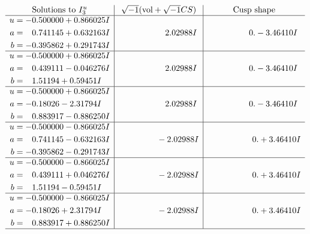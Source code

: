 \documentclass[1p]{elsarticle_modified}
\theoremstyle{definition}
\newcommand{\I}{\sqrt{-1}}
\begin{document}
$$\begin{array}{c|c|c}  
\text{Solutions to }I^u_{3}& \I (\text{vol} + \sqrt{-1}CS) & \text{Cusp shape}\\
 \hline 
\begin{aligned}
u &= -0.500000 + 0.866025 I \\
a &= \phantom{-}0.741145 + 0.632163 I \\
b &= -0.395862 + 0.291743 I\end{aligned}
 & \phantom{-0.000000 -}2.02988 I & \phantom{-0.000000 } 0. - 3.46410 I \\ \hline\begin{aligned}
u &= -0.500000 + 0.866025 I \\
a &= \phantom{-}0.439111 - 0.046276 I \\
b &= \phantom{-}1.51194 + 0.59451 I\end{aligned}
 & \phantom{-0.000000 -}2.02988 I & \phantom{-0.000000 } 0. - 3.46410 I \\ \hline\begin{aligned}
u &= -0.500000 + 0.866025 I \\
a &= -0.18026 - 2.31794 I \\
b &= \phantom{-}0.883917 - 0.886250 I\end{aligned}
 & \phantom{-0.000000 -}2.02988 I & \phantom{-0.000000 } 0. - 3.46410 I \\ \hline\begin{aligned}
u &= -0.500000 - 0.866025 I \\
a &= \phantom{-}0.741145 - 0.632163 I \\
b &= -0.395862 - 0.291743 I\end{aligned}
 & \phantom{-0.000000 } -2.02988 I & \phantom{-0.000000 -}0. + 3.46410 I \\ \hline\begin{aligned}
u &= -0.500000 - 0.866025 I \\
a &= \phantom{-}0.439111 + 0.046276 I \\
b &= \phantom{-}1.51194 - 0.59451 I\end{aligned}
 & \phantom{-0.000000 } -2.02988 I & \phantom{-0.000000 -}0. + 3.46410 I \\ \hline\begin{aligned}
u &= -0.500000 - 0.866025 I \\
a &= -0.18026 + 2.31794 I \\
b &= \phantom{-}0.883917 + 0.886250 I\end{aligned}
 & \phantom{-0.000000 } -2.02988 I & \phantom{-0.000000 -}0. + 3.46410 I\\
 \hline 
 \end{array}$$\newpage\newpage\renewcommand{\arraystretch}{1}
\end{document}
